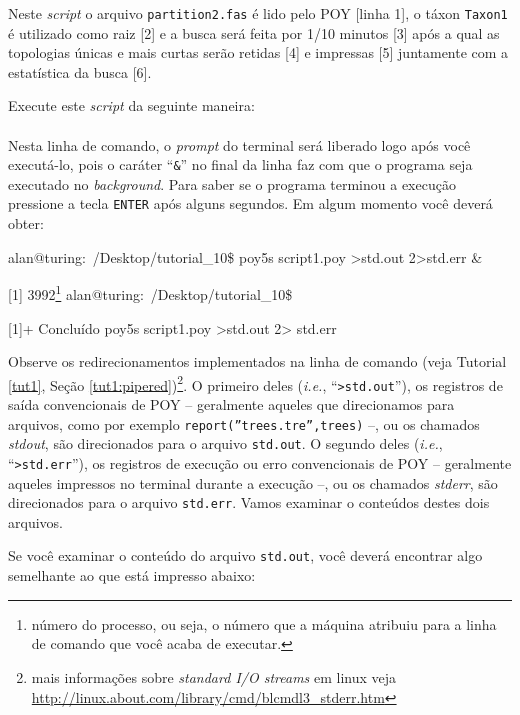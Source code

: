 \begin{refsection}
Neste \textit{script} o arquivo \texttt{partition2.fas} é lido pelo POY [linha 1], o táxon \texttt{Taxon1} é utilizado como raiz [2] e a busca será feita por 1/10 minutos [3] após a qual as topologias únicas e mais curtas serão retidas [4] e impressas [5] juntamente com a estatística da busca [6].

Execute este \textit{script} da seguinte maneira:\\

\\

Nesta linha de comando, o \textit{prompt} do terminal será liberado logo após você executá-lo, pois o caráter ``\texttt{\&}'' no final da linha faz com que o programa seja executado no \textit{background}. Para saber se o programa terminou a execução pressione a tecla \texttt{ENTER} após alguns segundos. Em algum momento você deverá obter:\\

\scriptsize

alan@turing:~/Desktop/tutorial\_10\$ poy5s script1.poy >std.out 2>std.err \&

[1] 3992\footnote{ número do processo, ou seja, o número que a máquina atribuiu para a linha de comando que você acaba de executar.}
\vspace{20pt}
alan@turing:~/Desktop/tutorial\_10\$ 

[1]+  Concluído              poy5s script1.poy >std.out 2> std.err\\

\normalsize

Observe os redirecionamentos implementados na linha de comando (veja Tutorial \ref{tut1}, Seção \ref{tut1:pipered})\footnote{ mais informações sobre \textit{standard I/O streams} em linux veja \url{http://linux.about.com/library/cmd/blcmdl3\_stderr.htm}}. O primeiro deles (\textit{i.e.}, ``\texttt{>std.out}''), os registros de saída convencionais de POY -- geralmente aqueles que direcionamos para arquivos, como por exemplo \texttt{report(''trees.tre'',trees)} --, ou os chamados \textit{stdout}, são direcionados para o arquivo \texttt{std.out}. O segundo deles (\textit{i.e.}, ``\texttt{>std.err}''), os registros de execução ou erro convencionais de POY -- geralmente aqueles impressos no terminal durante a execução --, ou os chamados \textit{stderr}, são direcionados para o arquivo \texttt{std.err}. Vamos examinar o conteúdos destes dois arquivos.

Se você examinar o conteúdo do arquivo \texttt{std.out}, você deverá encontrar algo semelhante ao que está impresso abaixo:



\end{refsection}
